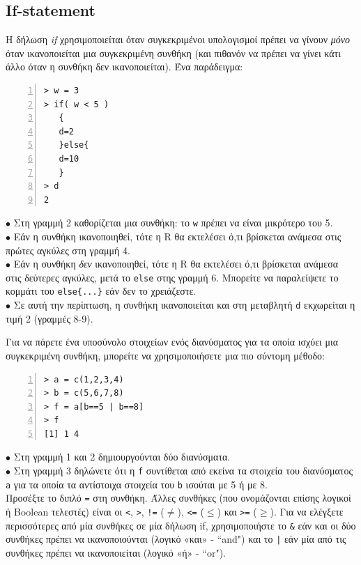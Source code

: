 \documentclass[a4paper,11pt,twocolumn,tablecaptionabove]{scrartcl}
\begin{document}
\subsection{If-statement}

Η δήλωση \emph{if} χρησιμοποιείται όταν συγκεκριμένοι υπολογισμοί πρέπει να γίνουν \emph{μόνο} όταν
ικανοποιείται μια συγκεκριμένη συνθήκη (και πιθανόν να πρέπει να γίνει κάτι άλλο όταν η συνθήκη δεν
ικανοποιείται). Ένα παράδειγμα:

\begin{Verbatim}[frame=single,numbers=left,gobble=0, xleftmargin=0.35cm, numbersep=0.1cm]
> w = 3
> if( w < 5 )
   {
   d=2
   }else{
   d=10
   }
> d
2
\end{Verbatim}

\noindent $\bullet$ Στη γραμμή 2 καθορίζεται μια συνθήκη: το \texttt{w} πρέπει να είναι μικρότερο του 5.\\
\noindent $\bullet$ Εάν η συνθήκη ικανοποιηθεί, τότε η R θα εκτελέσει ό,τι βρίσκεται ανάμεσα στις πρώτες αγκύλες
στη γραμμή 4.\\
\noindent $\bullet$ Εάν η συνθήκη \emph{δεν} ικανοποιηθεί, τότε η R θα εκτελέσει ό,τι βρίσκεται ανάμεσα στις
δεύτερες αγκύλες, μετά το \texttt{else} στης γραμμή 6. Μπορείτε να παραλείψετε το κομμάτι του \verb!else{...}!
εάν δεν το χρειάζεστε.\\
\noindent $\bullet$ Σε αυτή την περίπτωση, η συνθήκη ικανοποιείται και στη μεταβλητή \texttt{d} εκχωρείται
η τιμή 2 (γραμμές 8-9).

Για να πάρετε ένα υποσύνολο στοιχείων ενός διανύσματος για τα οποία ισχύει μια συγκεκριμένη συνθήκη, μπορείτε 
να χρησιμοποιήσετε μια πιο σύντομη μέθοδο:

\begin{Verbatim}[frame=single,numbers=left,gobble=0, xleftmargin=0.35cm, numbersep=0.1cm]
> a = c(1,2,3,4)
> b = c(5,6,7,8)
> f = a[b==5 | b==8]
> f
[1] 1 4
\end{Verbatim}

\noindent $\bullet$ Στη γραμμή 1 και 2 δημιουργούνται δύο διανύσματα.\\
\noindent $\bullet$ Στη γραμμή 3 δηλώνετε ότι η \texttt{f} συντίθεται από εκείνα τα στοιχεία του διανύσματος
\texttt{a} για τα οποία τα αντίστοιχα στοιχεία του \texttt{b} ισούται με 5 ή με 8. \\

Προσέξτε το διπλό \texttt{=} στη συνθήκη. Άλλες συνθήκες (που ονομάζονται επίσης λογικοί ή Boolean τελεστές)
είναι οι \texttt{<}, \texttt{>}, \texttt{!=} ($\neq$), \texttt{<=} ($\leq$) και \texttt{>=} ($\geq$). Για να
ελέγξετε περισσότερες από μία συνθήκες σε μία δήλωση if, χρησιμοποιήστε το \texttt{\&} εάν και οι δύο 
συνθήκες πρέπει να ικανοποιούνται (λογικό «και» - ``and") και το \texttt{|} εάν μία από τις συνθήκες πρέπει να 
ικανοποιείται (λογικό «ή» - ``or").
\end{document}

